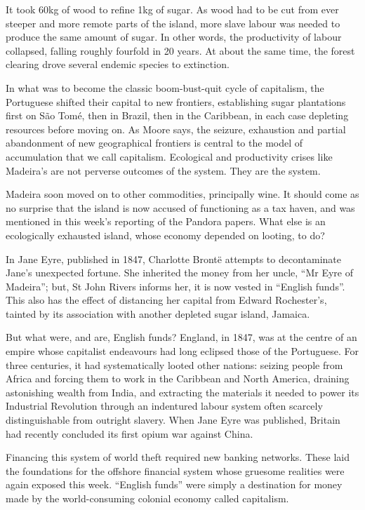 \documentclass[
]{book}
\begin{document}
It took 60kg of wood to refine 1kg of sugar. As wood had to be cut from ever steeper and more remote parts of the island, more slave labour was needed to produce the same amount of sugar. In other words, the productivity of labour collapsed, falling roughly fourfold in 20 years. At about the same time, the forest clearing drove several endemic species to extinction.

In what was to become the classic boom-bust-quit cycle of capitalism, the Portuguese shifted their capital to new frontiers, establishing sugar plantations first on São Tomé, then in Brazil, then in the Caribbean, in each case depleting resources before moving on. As Moore says, the seizure, exhaustion and partial abandonment of new geographical frontiers is central to the model of accumulation that we call capitalism. Ecological and productivity crises like Madeira's are not perverse outcomes of the system. They are the system.

Madeira soon moved on to other commodities, principally wine. It should come as no surprise that the island is now accused of functioning as a tax haven, and was mentioned in this week's reporting of the Pandora papers. What else is an ecologically exhausted island, whose economy depended on looting, to do?

In Jane Eyre, published in 1847, Charlotte Brontë attempts to decontaminate Jane's unexpected fortune. She inherited the money from her uncle, ``Mr Eyre of Madeira''; but, St John Rivers informs her, it is now vested in ``English funds''. This also has the effect of distancing her capital from Edward Rochester's, tainted by its association with another depleted sugar island, Jamaica.

But what were, and are, English funds? England, in 1847, was at the centre of an empire whose capitalist endeavours had long eclipsed those of the Portuguese. For three centuries, it had systematically looted other nations: seizing people from Africa and forcing them to work in the Caribbean and North America, draining astonishing wealth from India, and extracting the materials it needed to power its Industrial Revolution through an indentured labour system often scarcely distinguishable from outright slavery. When Jane Eyre was published, Britain had recently concluded its first opium war against China.

Financing this system of world theft required new banking networks. These laid the foundations for the offshore financial system whose gruesome realities were again exposed this week. ``English funds'' were simply a destination for money made by the world-consuming colonial economy called capitalism.
\end{document}
